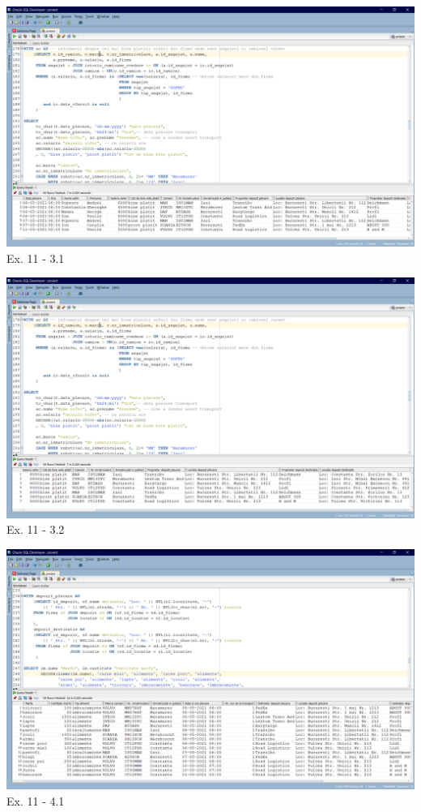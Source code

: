 \documentclass[12pt, a4paper]{article}
\begin{document}
\includegraphics[width=\textwidth]{ex11_3_1.PNG}
\label{Ex11 3.1}
\centering Ex. 11 - 3.1

\includegraphics[width=\textwidth]{ex11_3_2.PNG}
\label{Ex11 3.2}
\centering Ex. 11 - 3.2

\includegraphics[width=\textwidth]{ex11_4_1.PNG}
\label{Ex11 4.1}
\centering Ex. 11 - 4.1
\end{document}
